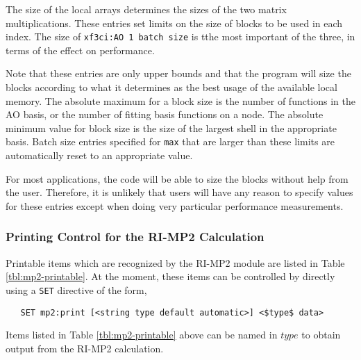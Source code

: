 The size of the local arrays determines the sizes of
the two matrix multiplications.  These entries set limits on the size
of blocks to be used in each index.  The size of \verb+xf3ci:AO 1 batch size+
is tthe most important of the three, in terms of the effect on performance.


Note that these entries are only upper bounds and that the program
will size the blocks according to what it determines as the best usage of
the available local memory.  The absolute maximum for a block size is
the number of functions in the AO basis, or the number of fitting basis
functions on a node.  The absolute minimum value for block size is the 
size of the largest shell in the appropriate basis.  Batch size entries 
specified for \verb+max+  that are larger than these limits are 
automatically reset to an appropriate value.

For most applications, the code will be able to size the blocks without
help from the user.  Therefore, it is unlikely that users will have 
any reason to specify values for these entries
except when doing very particular performance measurements.

\subsubsection{Printing Control for the RI-MP2 Calculation}

Printable items which are recognized by the RI-MP2 module are listed
in Table \ref{tbl:mp2-printable}.  At the moment, these items can be
controlled by directly using a \verb+SET+ directive of the form,

\begin{verbatim}
   SET mp2:print [<string type default automatic>] <$type$ data>
\end{verbatim}

Items listed in Table \ref{tbl:mp2-printable} above can be named in 
$type$ to obtain output from the RI-MP2 calculation.


